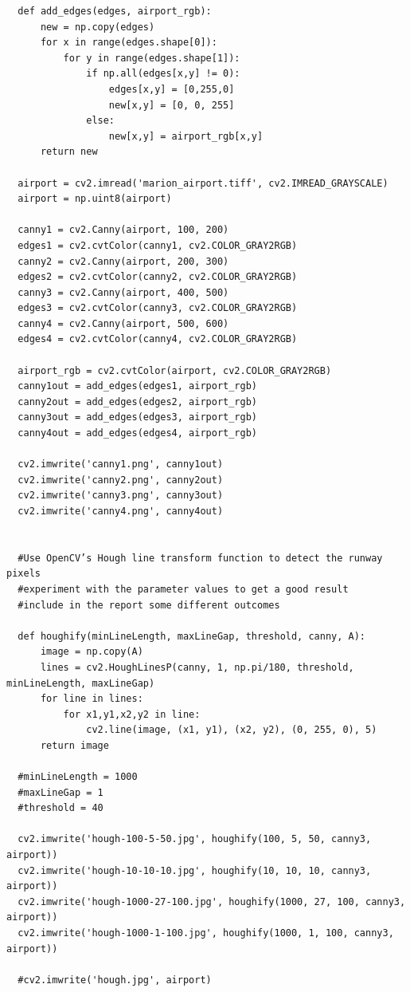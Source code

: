 \documentclass{article}
\begin{document}
\begin{verbatim}
  def add_edges(edges, airport_rgb):
      new = np.copy(edges)
      for x in range(edges.shape[0]):
          for y in range(edges.shape[1]):
              if np.all(edges[x,y] != 0):
                  edges[x,y] = [0,255,0]
                  new[x,y] = [0, 0, 255]
              else:
                  new[x,y] = airport_rgb[x,y]
      return new

  airport = cv2.imread('marion_airport.tiff', cv2.IMREAD_GRAYSCALE)
  airport = np.uint8(airport)

  canny1 = cv2.Canny(airport, 100, 200)
  edges1 = cv2.cvtColor(canny1, cv2.COLOR_GRAY2RGB)
  canny2 = cv2.Canny(airport, 200, 300)
  edges2 = cv2.cvtColor(canny2, cv2.COLOR_GRAY2RGB)
  canny3 = cv2.Canny(airport, 400, 500)
  edges3 = cv2.cvtColor(canny3, cv2.COLOR_GRAY2RGB)
  canny4 = cv2.Canny(airport, 500, 600)
  edges4 = cv2.cvtColor(canny4, cv2.COLOR_GRAY2RGB)

  airport_rgb = cv2.cvtColor(airport, cv2.COLOR_GRAY2RGB)
  canny1out = add_edges(edges1, airport_rgb)
  canny2out = add_edges(edges2, airport_rgb)
  canny3out = add_edges(edges3, airport_rgb)
  canny4out = add_edges(edges4, airport_rgb)

  cv2.imwrite('canny1.png', canny1out)
  cv2.imwrite('canny2.png', canny2out)
  cv2.imwrite('canny3.png', canny3out)
  cv2.imwrite('canny4.png', canny4out)


  #Use OpenCV’s Hough line transform function to detect the runway pixels
  #experiment with the parameter values to get a good result
  #include in the report some different outcomes

  def houghify(minLineLength, maxLineGap, threshold, canny, A):
      image = np.copy(A)
      lines = cv2.HoughLinesP(canny, 1, np.pi/180, threshold, minLineLength, maxLineGap)
      for line in lines:
          for x1,y1,x2,y2 in line:
              cv2.line(image, (x1, y1), (x2, y2), (0, 255, 0), 5)
      return image

  #minLineLength = 1000
  #maxLineGap = 1
  #threshold = 40

  cv2.imwrite('hough-100-5-50.jpg', houghify(100, 5, 50, canny3, airport))
  cv2.imwrite('hough-10-10-10.jpg', houghify(10, 10, 10, canny3, airport))
  cv2.imwrite('hough-1000-27-100.jpg', houghify(1000, 27, 100, canny3, airport))
  cv2.imwrite('hough-1000-1-100.jpg', houghify(1000, 1, 100, canny3, airport))

  #cv2.imwrite('hough.jpg', airport)

\end{verbatim}
\end{document}
